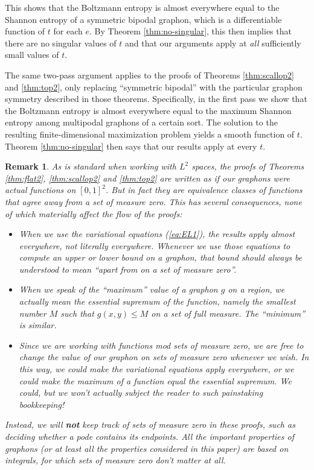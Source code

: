 \documentclass[12pt]{amsart}
\newtheorem{remark}[lemma]{Remark}
\begin{document}
{This shows that the Boltzmann entropy is almost everywhere 
equal to the Shannon entropy of a symmetric bipodal graphon, which is a differentiable function of $t$ for 
each $e$. 
By Theorem \ref{thm:no-singular}, this then implies that there are no singular values of $t$ and that our arguments apply at 
{\em all} sufficiently small values of $t$.

The same two-pass argument applies to the proofs of Theorems \ref{thm:scallop2} and \ref{thm:top2}, only replacing
``symmetric bipodal'' with the particular graphon symmetry described in those theorems. Specifically,
in the first pass we show that the Boltzmann entropy is almost everywhere equal to the maximum Shannon entropy
among multipodal graphons of a certain sort. The solution to the resulting finite-dimensional maximization problem
yields a smooth function of $t$. Theorem \ref{thm:no-singular} then says that our results apply at every $t$.

\begin{remark} As is standard when working with $L^2$ spaces, the proofs of Theorems 
\ref{thm:flat2}, \ref{thm:scallop2} and \ref{thm:top2} are written as if our graphons were actual functions
on $[0,1]^2$. But in fact they are equivalence classes of functions that agree away from a set of measure
zero. This has several consequences, none of which materially affect the flow of the proofs: 
\begin{itemize}
\item When we use the variational equations (\ref{eq:EL1}), the results apply almost everywhere, not
literally everywhere.  Whenever we use those equations to compute an upper or lower bound on a graphon, that bound should always
be understood to mean ``apart from on a set of measure zero''. 
\item When we speak of the ``maximum'' value of a graphon $g$ on a region, we actually mean the 
essential supremum of the function, namely the smallest number $M$ such that $g(x,y) \le M$ on a set of 
full measure. The ``minimum'' is similar.
\item Since we are working with functions mod sets of measure zero, we are free to change the value of 
our graphon on sets of measure zero whenever we wish. In this way, we could make the variational equations
apply everywhere, or we could make the maximum of a function equal the essential supremum. We 
{\em could}, but we won't actually subject the reader to such painstaking bookkeeping! 
\end{itemize}
Instead, we will {\bf not} keep track of sets of measure zero in these proofs, such as deciding 
whether a 
pode contains its endpoints. All the important properties of graphons (or at least all the properties
considered in this paper) are based on integrals, for which sets of measure zero don't matter at all.
\end{remark}

}
\end{document}
